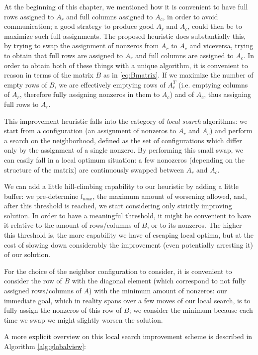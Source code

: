At the beginning of this chapter, we mentioned how it is convenient to have full rows assigned to $A_r$ and full columns assigned to $A_c$, in order to avoid communication; a good strategy to produce good $A_r$ and $A_c$, could then be to maximize such full assignments. The proposed heuristic does substantially this, by trying to swap the assignment of nonzeros from $A_r$ to $A_c$ and viceversa, trying to obtain that full rows are assigned to $A_r$ and full columns are assigned to $A_c$. In order to obtain both of these things with a unique algorithm, it is convenient to reason in terms of the matrix $B$ as in \eqref{eq:Bmatrix}. If we maximize the number of empty rows of $B$, we are effectively emptying rows of $A_r^T$ (i.e. emptying columns of $A_r$, therefore fully assigning nonzeros in them to $A_c$) and of $A_c$, thus assigning full rows to $A_r$.

This improvement heuristic falls into the category of \emph{local search} algorithms: we start from a configuration (an assignment of nonzeros to $A_r$ and $A_c$) and perform a search on the neighborhood, defined as the set of configurations which differ only by the assignment of a single nonzero. By performing this small swap, we can easily fall in a local optimum situation: a few nonozeros (depending on the structure of the matrix) are continuously swapped between $A_r$ and $A_c$. 

We can add a little hill-climbing capability to our heuristic by adding a little buffer: we pre-determine $l_{max}$, the maximum amount of worsening allowed, and, after this threshold is reached, we start considering only strictly improving solution. In order to have a meaningful threshold, it might be convenient to have it relative to the amount of rows/columns of $B$, or to its nonzeros. The higher this threshold is, the more capability we have of escaping local optima, but at the cost of slowing down considerably the improvement (even potentially arresting it) of our solution.

For the choice of the neighbor configuration to consider, it is convenient to consider the row of $B$ with the diagonal element (which correspond to not fully assigned rows/columns of $A$) with the minimum amount of nonzeros: our immediate goal, which in reality spans over a few moves of our local search, is to fully assign the nonzeros of this row of $B$; we consider the minimum because each time we swap we might slightly worsen the solution.

A more explicit overview on this local search improvement scheme is described in Algorithm \ref{alg:globalview}:


